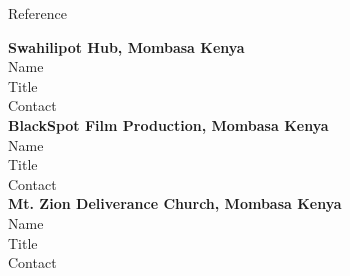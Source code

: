 \documentclass[
	11pt, %
]{resume} %
\begin{document}

\begin{rSection}{Reference}

	\textbf{Swahilipot Hub, Mombasa Kenya}\\
	Name\\
	Title\\
	Contact \smallskip \\
	\textbf{BlackSpot Film Production, Mombasa Kenya}\\
	Name\\
	Title\\
	Contact \smallskip \\
	\textbf{Mt. Zion Deliverance Church, Mombasa Kenya}\\
	Name\\
	Title\\
	Contact \smallskip \\
	

\end{rSection}

\end{document}
